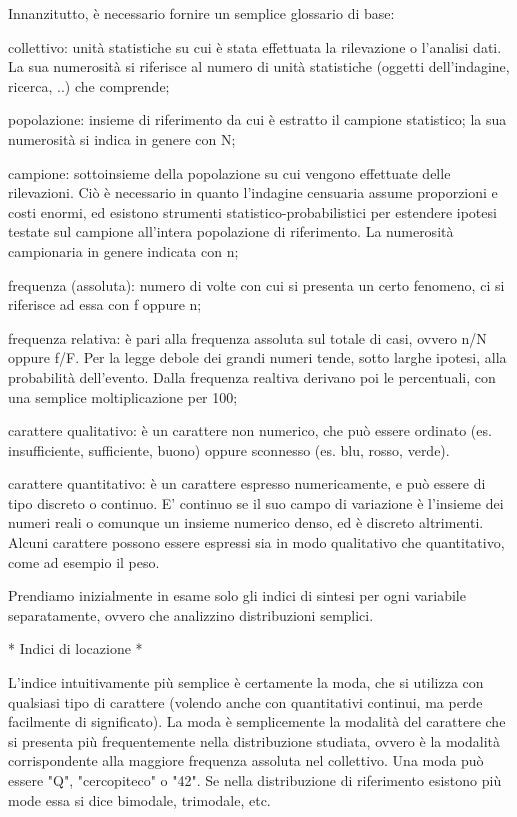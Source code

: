 \documentclass{book}
\begin{document}
Innanzitutto, \`{e} necessario fornire un semplice glossario di base:
\begin{list}{*}{}
\item collettivo: unit\`{a} statistiche su cui \`{e} stata effettuata la rilevazione o l'analisi dati. La sua numerosit\`{a} si riferisce al numero di unit\`{a} statistiche (oggetti dell'indagine, ricerca, ..) che comprende;
\item popolazione: insieme di riferimento da cui \`{e} estratto il campione statistico; la sua numerosit\`{a} si indica in genere con N;
\item campione: sottoinsieme della popolazione su cui vengono effettuate delle rilevazioni. Ciò \`{e} necessario in quanto l'indagine censuaria assume proporzioni e costi enormi, ed esistono strumenti statistico-probabilistici per estendere ipotesi testate sul campione all'intera popolazione di riferimento. La numerosit\`{a} campionaria in genere indicata con n;
\item frequenza (assoluta): numero di volte con cui si presenta un certo fenomeno, ci si riferisce ad essa con f oppure n;
\item frequenza relativa: \`{e} pari alla frequenza assoluta sul totale di casi, ovvero n/N oppure f/F. Per la legge debole dei grandi numeri tende, sotto larghe ipotesi, alla probabilit\`{a} dell'evento. Dalla frequenza realtiva derivano poi le percentuali, con una semplice moltiplicazione per 100;
\item carattere qualitativo: \`{e} un carattere non numerico, che può essere ordinato (es. insufficiente, sufficiente, buono) oppure sconnesso (es. blu, rosso, verde).
\item carattere quantitativo: \`{e} un carattere espresso numericamente, e può essere di tipo discreto o continuo. E' continuo se il suo campo di variazione \`{e} l'insieme dei numeri reali o comunque un insieme numerico denso, ed \`{e} discreto altrimenti. Alcuni carattere possono essere espressi sia in modo qualitativo che quantitativo, come ad esempio il peso.
\end{list}

Prendiamo inizialmente in esame solo gli indici di sintesi per ogni variabile separatamente, ovvero che analizzino distribuzioni semplici.

* Indici di locazione *

L'indice intuitivamente più semplice \`{e} certamente la moda, che si utilizza con qualsiasi tipo di carattere (volendo anche con quantitativi continui, ma perde facilmente di significato).
La moda \`{e} semplicemente la modalit\`{a} del carattere che si presenta più frequentemente nella distribuzione studiata, ovvero \`{e} la modalit\`{a} corrispondente alla maggiore frequenza assoluta nel collettivo.
Una moda può essere "Q", "cercopiteco" o "42". Se nella distribuzione di riferimento esistono più mode essa si dice bimodale, trimodale, etc.
\end{document}
